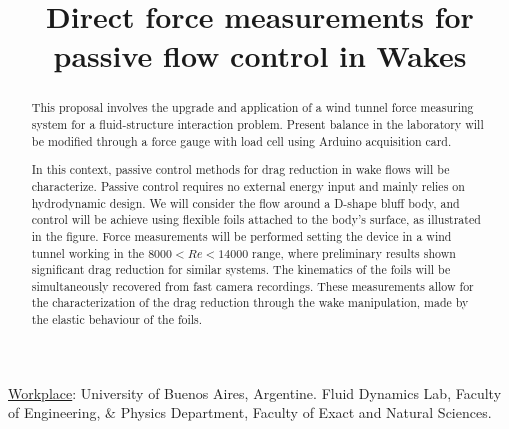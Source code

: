 \documentclass[english,12pt,a4paper]{article}
\begin{document}
	
	
	
	\title{Direct force measurements for passive flow control in Wakes}
	\date{}
	\maketitle
	\vspace{-1 cm}
	
	
	\begin{abstract}
		
		This proposal involves the upgrade and application of a wind tunnel force measuring system  for a fluid-structure interaction problem. Present balance in the laboratory will be modified through a force gauge with load cell using Arduino acquisition card.
		
		In this context, passive control methods for drag reduction in wake flows will be characterize. Passive control requires no external energy input and mainly relies on  hydrodynamic design. We will consider the flow around a D-shape bluff body, and control will be achieve using flexible foils attached to the body's surface, as illustrated in the figure. Force measurements will be performed setting the device in a wind tunnel working in the $8000<Re<14000$ range, where preliminary results shown significant drag reduction for similar systems. The kinematics of the foils will be simultaneously recovered from fast camera recordings. These measurements allow for the characterization of the drag reduction through the wake manipulation, made by the elastic behaviour of the foils. 
		
		\begin{figure}[htb]
\centering\resizebox{.7\columnwidth}{!}{%
			
}
		\end{figure}
	\end{abstract}
	
	\vspace{1 cm}\noindent \underline{Workplace}: University of Buenos Aires, Argentine. Fluid Dynamics Lab, Faculty of Engineering, $\&$ Physics Department, Faculty of Exact and Natural Sciences. \\
	
\end{document}
